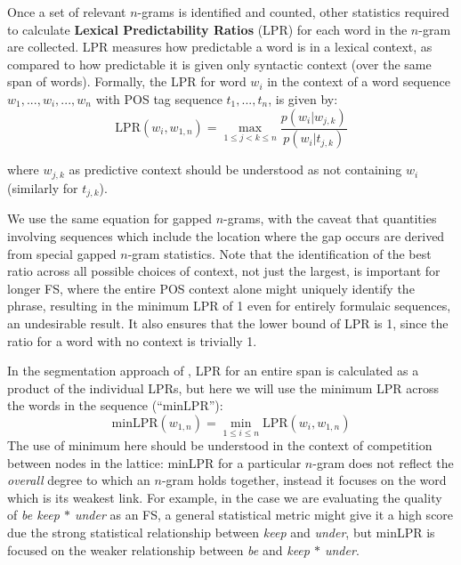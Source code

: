 \documentclass[11pt,letterpaper]{article}
\newcommand{\gap}{$*$\xspace}
\newcommand{\ex}[1]{\textit{#1}\xspace}
\newcommand{\termdef}[1]{\textbf{#1}\xspace}
\newcommand{\LPR}{\ensuremath{\text{LPR}}}
\newcommand{\minLPR}{\ensuremath{\text{minLPR}}}
\begin{document}
Once a set of relevant $n$-grams is identified and counted, other statistics required to calculate \termdef{Lexical Predictability Ratios} (LPR) for each word in the $n$-gram are collected. LPR measures how predictable a word is in a lexical context, as compared to how predictable it is given only syntactic context (over the same span of words). Formally, the LPR for word $w_i$ in the context of a word sequence $w_1,..., w_i, ..., w_{n}$ with POS tag sequence $t_1, ..., t_{n}$, is given by:
\begin{displaymath}
\LPR(w_i,w_{1,n}) = \max_{1 \leq j < k \leq n }{\frac{p(w_i|w_{j,k})}{p(w_i|t_{j,k})}}
\end{displaymath}

\noindent
where $w_{j,k}$ as predictive context should be understood as not containing $w_{i}$ (similarly for $t_{j,k}$). 

We use the same equation for gapped $n$-grams, with the caveat that quantities involving sequences which include the location where the gap occurs are derived from special gapped $n$-gram statistics. Note that the identification of the best ratio across all possible choices of context, not just the largest, is important for longer FS, where the entire POS context alone might uniquely identify the phrase, resulting in the minimum LPR of 1 even for entirely formulaic sequences, an undesirable result. 
It also ensures that the lower bound of LPR is 1, since the ratio for a word with no context is trivially 1.

In the segmentation approach of , LPR for an entire span is calculated as a product of the individual LPRs, but here we will use the minimum LPR across the words in the sequence (``\minLPR''):
\begin{displaymath}
\minLPR(w_{1,n}) = \min_{1 \leq i \leq n }{\LPR(w_i,w_{1,n})}
\end{displaymath}
The use of minimum here should be understood in the context of competition between nodes in the lattice: minLPR for a particular $n$-gram does not reflect the \emph{overall} degree to which an $n$-gram holds together, instead it focuses on the word which is its weakest link. For example, in the case we are evaluating the quality of \ex{be keep \gap under} as an FS, a general statistical metric might give it a high score due the strong statistical relationship between \ex{keep} and \ex{under}, but minLPR is focused on the weaker relationship between \ex{be} and \ex{keep \gap under}.
\end{document}
